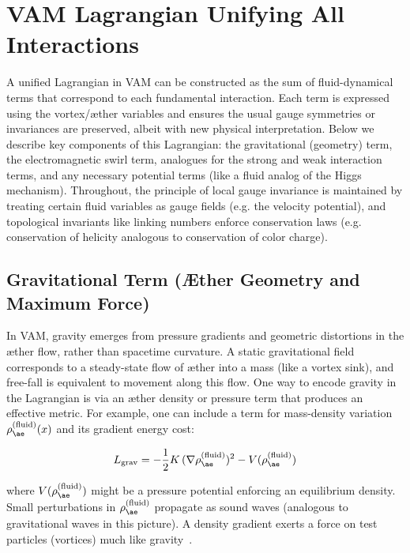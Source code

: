 \section{VAM Lagrangian Unifying All Interactions}

A unified Lagrangian in VAM can be constructed as the sum of fluid-dynamical terms that correspond to each fundamental interaction. Each term is expressed using the vortex/æther variables and ensures the usual gauge symmetries or invariances are preserved, albeit with new physical interpretation. Below we describe key components of this Lagrangian: the gravitational (geometry) term, the electromagnetic swirl term, analogues for the strong and weak interaction terms, and any necessary potential terms (like a fluid analog of the Higgs mechanism). Throughout, the principle of local gauge invariance is maintained by treating certain fluid variables as gauge fields (e.g. the velocity potential), and topological invariants like linking numbers enforce conservation laws (e.g. conservation of helicity analogous to conservation of color charge).

\subsection{Gravitational Term (Æther Geometry and Maximum Force)}

In VAM, gravity emerges from pressure gradients and geometric distortions in the æther flow, rather than spacetime curvature. A static gravitational field corresponds to a steady-state flow of æther into a mass (like a vortex sink), and free-fall is equivalent to movement along this flow. One way to encode gravity in the Lagrangian is via an æther density or pressure term that produces an effective metric. For example, one can include a term for mass-density variation \( \rho_{\ae}^{(\text{fluid})}(x) \) and its gradient energy cost:

\begin{equation}
    L_{\text{grav}} = -\frac{1}{2}K\,(\nabla \rho_{\ae}^{(\text{fluid})})^2 - V(\rho_{\ae}^{(\text{fluid})})
    \label{eq:grav-lagrangian}
\end{equation}

where \( V(\rho_{\ae}^{(\text{fluid})}) \) might be a pressure potential enforcing an equilibrium density. Small perturbations in \( \rho_{\ae}^{(\text{fluid})} \) propagate as sound waves (analogous to gravitational waves in this picture). A density gradient exerts a force on test particles (vortices) much like gravity~\cite{VAM3}.

